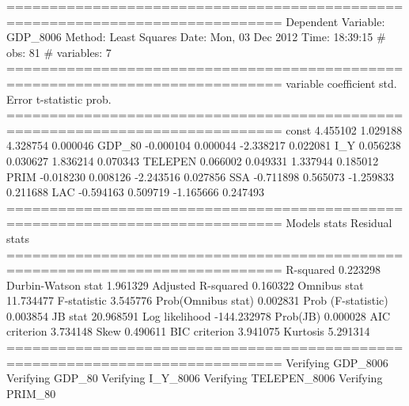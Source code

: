 ==============================================================================
Dependent Variable: GDP_8006
Method: Least Squares
Date:  Mon, 03 Dec 2012
Time:  18:39:15
# obs:                  81
# variables:         7
==============================================================================
variable     coefficient     std. Error      t-statistic     prob.
==============================================================================
const           4.455102      1.029188      4.328754      0.000046
GDP_80          -0.000104      0.000044     -2.338217      0.022081
I_Y             0.056238      0.030627      1.836214      0.070343
TELEPEN           0.066002      0.049331      1.337944      0.185012
PRIM           -0.018230      0.008126     -2.243516      0.027856
SSA            -0.711898      0.565073     -1.259833      0.211688
LAC            -0.594163      0.509719     -1.165666      0.247493
==============================================================================
Models stats                         Residual stats
==============================================================================
R-squared             0.223298         Durbin-Watson stat   1.961329
Adjusted R-squared    0.160322         Omnibus stat         11.734477
F-statistic           3.545776         Prob(Omnibus stat)   0.002831
Prob (F-statistic)    0.003854			JB stat              20.968591
Log likelihood       -144.232978			Prob(JB)             0.000028
AIC criterion         3.734148         Skew                 0.490611
BIC criterion         3.941075         Kurtosis             5.291314
==============================================================================
Verifying GDP_8006
Verifying GDP_80
Verifying I_Y_8006
Verifying TELEPEN_8006
Verifying PRIM_80

